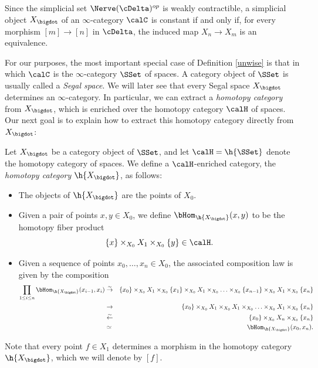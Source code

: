 \begin{remark}\label{supling}
Since the simplicial set $\Nerve(\cDelta)^{op}$ is weakly contractible, a simplicial object
$X_{\bigdot}$ of an $\infty$-category $\calC$ is constant if and only if, for every morphism
$[m] \rightarrow [n]$ in $\cDelta$, the induced map $X_n \rightarrow X_m$ is an equivalence.
\end{remark}

For our purposes, the most important special case of Definition \ref{unwise} is that
in which $\calC$ is the $\infty$-category $\SSet$ of spaces. A category object of
$\SSet$ is usually called a {\it Segal space}. We will later see that every
Segal space $X_{\bigdot}$ determines an $\infty$-category. In particular, we can
extract a {\it homotopy category} from $X_{\bigdot}$, which is enriched over the
homotopy category $\calH$ of spaces. Our next goal is to explain how to extract this
homotopy category directly from $X_{\bigdot}$:

\begin{definition}\label{cabler}
Let $X_{\bigdot}$ be a category object of $\SSet$, and let $\calH = \h{\SSet}$ denote the homotopy category of spaces. We define a $\calH$-enriched category, the {\it homotopy category $\h{X_{\bigdot}}$}, as follows:
\begin{itemize}
\item[$(1)$] The objects of $\h{ X_{\bigdot}}$ are the points of $X_{0}$.
\item[$(2)$] Given a pair of points $x,y \in X_0$, we define
$\bHom_{ \h{X_{\bigdot}}}( x,y)$ to be the homotopy fiber product
$$ \{x\} \times_{ X_0 } X_1 \times_{ X_0 } \{y\} \in \calH.$$
\item[$(3)$] Given a sequence of points $x_0, \ldots, x_n \in X_0$, the associated composition law is
given by the composition
\begin{align*}
\prod_{1 \leq i \leq n} \bHom_{\h{X_{\bigdot}}}(x_{i-1}, x_i) & \stackrel{\sim}{\rightarrow} & \{x_0\} \times_{ X_0} X_1 \times_{ X_0 } \{x_1\} \times_{ X_0} X_1 \times_{X_0} \ldots \times_{ X_{0}} \{ x_{n-1} \} \times_{X_0} X_1 \times_{X_0} \{x_n\} \\
& \rightarrow & \{x_0 \} \times_{X_0} X_1 \times_{X_0} X_1 \times_{X_0} \ldots \times_{X_0} X_1 \times_{X_0} \{x_{n} \} \\
& \stackrel{\sim}{\leftarrow} & \{x_0\} \times_{X_0} X_n \times_{ X_0} \{x_n\} \\
& \simeq & \bHom_{ \h{X_{\bigdot}}}( x_0, x_n).
\end{align*}
\end{itemize}
Note that every point $f \in X_{1}$ determines a morphism in the homotopy category
$\h{X_{\bigdot}}$, which we will denote by $[f]$.
\end{definition}

